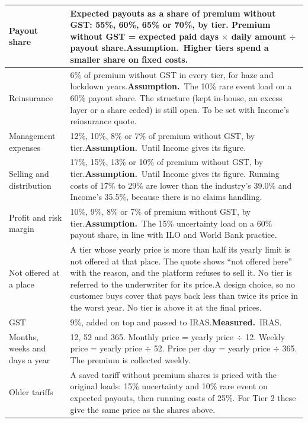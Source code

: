 \documentclass[11pt,a4paper]{article}
\newcommand{\measured}{\textcolor{measured}{\textbf{Measured.}}}
\newcommand{\assumed}{\textcolor{assumed}{\textbf{Assumption.}}}
\begin{document}
{\begin{xltabular}{\textwidth}{|K{3.4cm}|Y|}
\hline
Payout share & Expected payouts as a share of premium without GST: 55\%, 60\%, 65\% or 70\%, by tier. Premium without GST = expected paid days $\times$ daily amount $\div$ payout share.\newline \assumed\ Higher tiers spend a smaller share on fixed costs. \\
\hline
Reinsurance & 6\% of premium without GST in every tier, for haze and lockdown years.\newline \assumed\ The 10\% rare event load on a 60\% payout share. The structure (kept in-house, an excess layer or a share ceded) is still open. To be set with Income's reinsurance quote. \\
\hline
Management expenses & 12\%, 10\%, 8\% or 7\% of premium without GST, by tier.\newline \assumed\ Until Income gives its figure. \\
\hline
Selling and distribution & 17\%, 15\%, 13\% or 10\% of premium without GST, by tier.\newline \assumed\ Until Income gives its figure. Running costs of 17\% to 29\% are lower than the industry's 39.0\% and Income's 35.5\%,\cite{mas} because there is no claims handling. \\
\hline
Profit and risk margin & 10\%, 9\%, 8\% or 7\% of premium without GST, by tier.\newline \assumed\ The 15\% uncertainty load on a 60\% payout share, in line with ILO and World Bank practice.\cite{ilo,worldbank} \\
\hline
Not offered at a place & A tier whose yearly price is more than half its yearly limit is not offered at that place. The quote shows ``not offered here'' with the reason, and the platform refuses to sell it. No tier is referred to the underwriter for its price.\newline A design choice, so no customer buys cover that pays back less than twice its price in the worst year. No tier is above it at the final prices. \\
\hline
GST & 9\%, added on top and passed to IRAS.\newline \measured\ IRAS.\cite{iras} \\
\hline
Months, weeks and days a year & 12, 52 and 365. Monthly price = yearly price $\div$ 12. Weekly price = yearly price $\div$ 52. Price per day = yearly price $\div$ 365. The premium is collected weekly. \\
\hline
Older tariffs & A saved tariff without premium shares is priced with the original loads: 15\% uncertainty and 10\% rare event on expected payouts, then running costs of 25\%. For Tier 2 these give the same price as the shares above. \\
\hline
\end{xltabular}}
\end{document}
